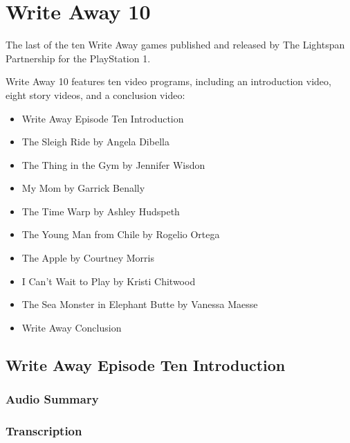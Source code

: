 \chapter{Write Away 10}


The last of the ten Write Away games published and released by The Lightspan Partnership for the PlayStation 1.

Write Away 10 features ten video programs, including an introduction video, eight story videos, and a conclusion video:

\begin{itemize}
    \item Write Away Episode Ten Introduction
    \item The Sleigh Ride by Angela Dibella
    \item The Thing in the Gym by Jennifer Wisdon
    \item My Mom by Garrick Benally
    \item The Time Warp by Ashley Hudspeth
    \item The Young Man from Chile by Rogelio Ortega
    \item The Apple by Courtney Morris
    \item I Can't Wait to Play by Kristi Chitwood
    \item The Sea Monster in Elephant Butte by Vanessa Maesse
    \item Write Away Conclusion
\end{itemize}

\clearpage
\newpage

\section{Write Away Episode Ten Introduction}

\subsection{Audio Summary}

\subsection{Transcription}

